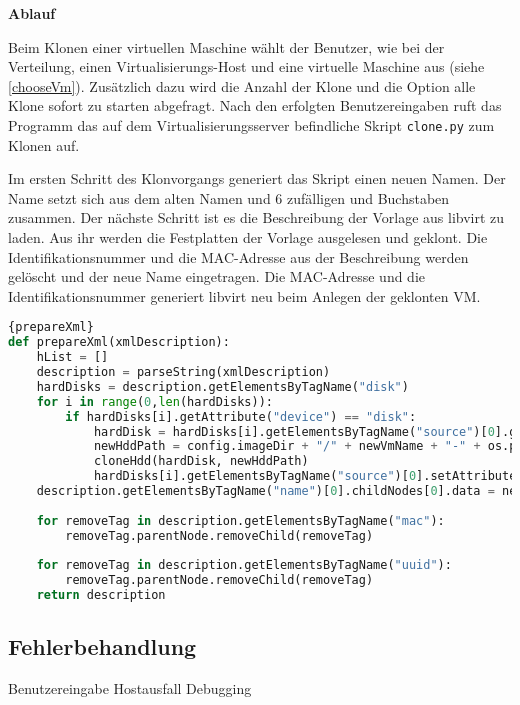 \textbf{Ablauf}

Beim Klonen einer virtuellen Maschine wählt der Benutzer, wie bei der Verteilung, einen Virtualisierungs-Host und eine virtuelle Maschine aus (siehe \ref{chooseVm}). Zusätzlich dazu wird die Anzahl der Klone und die Option alle Klone sofort zu starten abgefragt. Nach den erfolgten Benutzereingaben ruft das Programm das auf dem Virtualisierungsserver befindliche Skript \lstinline|clone.py| zum Klonen auf.

Im ersten Schritt des Klonvorgangs generiert das Skript einen neuen Namen. Der Name setzt sich aus dem alten Namen und 6 zufälligen und Buchstaben zusammen. Der nächste Schritt ist es die Beschreibung der Vorlage aus libvirt zu laden. Aus ihr werden die Festplatten der Vorlage ausgelesen und geklont. Die Identifikationsnummer und die MAC-Adresse aus der Beschreibung werden gelöscht und der neue Name eingetragen. Die MAC-Adresse und die Identifikationsnummer generiert libvirt neu beim Anlegen der geklonten VM.
\\
\begin{lstlisting}[caption=XML-Bearbeitung,language=Python, label=prepareXml]{prepareXml}
def prepareXml(xmlDescription):
	hList = []
	description = parseString(xmlDescription)
	hardDisks = description.getElementsByTagName("disk")
	for i in range(0,len(hardDisks)):
		if hardDisks[i].getAttribute("device") == "disk":
			hardDisk = hardDisks[i].getElementsByTagName("source")[0].getAttribute("file")
			newHddPath = config.imageDir + "/" + newVmName + "-" + os.path.basename(hardDisk)
			cloneHdd(hardDisk, newHddPath)
			hardDisks[i].getElementsByTagName("source")[0].setAttribute("file", newHddPath)
	description.getElementsByTagName("name")[0].childNodes[0].data = newVmName
	
	for removeTag in description.getElementsByTagName("mac"):
		removeTag.parentNode.removeChild(removeTag)
	
	for removeTag in description.getElementsByTagName("uuid"):
		removeTag.parentNode.removeChild(removeTag)
	return description
\end{lstlisting}
\subsection{Fehlerbehandlung}
Benutzereingabe
Hostausfall
Debugging